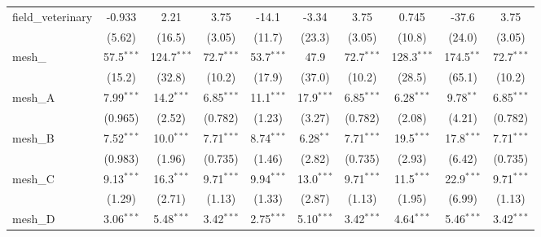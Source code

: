 \begin{tabular}{lccccccccc}
   field\_veterinary                                           & -0.933        & 2.21          & 3.75          & -14.1        & -3.34         & 3.75          & 0.745         & -37.6          & 3.75\\   
                                                               & (5.62)        & (16.5)        & (3.05)        & (11.7)       & (23.3)        & (3.05)        & (10.8)        & (24.0)         & (3.05)\\   
   mesh\_                                                      & 57.5$^{***}$  & 124.7$^{***}$ & 72.7$^{***}$  & 53.7$^{***}$ & 47.9          & 72.7$^{***}$  & 128.3$^{***}$ & 174.5$^{**}$   & 72.7$^{***}$\\   
                                                               & (15.2)        & (32.8)        & (10.2)        & (17.9)       & (37.0)        & (10.2)        & (28.5)        & (65.1)         & (10.2)\\   
   mesh\_A                                                     & 7.99$^{***}$  & 14.2$^{***}$  & 6.85$^{***}$  & 11.1$^{***}$ & 17.9$^{***}$  & 6.85$^{***}$  & 6.28$^{***}$  & 9.78$^{**}$    & 6.85$^{***}$\\   
                                                               & (0.965)       & (2.52)        & (0.782)       & (1.23)       & (3.27)        & (0.782)       & (2.08)        & (4.21)         & (0.782)\\   
   mesh\_B                                                     & 7.52$^{***}$  & 10.0$^{***}$  & 7.71$^{***}$  & 8.74$^{***}$ & 6.28$^{**}$   & 7.71$^{***}$  & 19.5$^{***}$  & 17.8$^{***}$   & 7.71$^{***}$\\   
                                                               & (0.983)       & (1.96)        & (0.735)       & (1.46)       & (2.82)        & (0.735)       & (2.93)        & (6.42)         & (0.735)\\   
   mesh\_C                                                     & 9.13$^{***}$  & 16.3$^{***}$  & 9.71$^{***}$  & 9.94$^{***}$ & 13.0$^{***}$  & 9.71$^{***}$  & 11.5$^{***}$  & 22.9$^{***}$   & 9.71$^{***}$\\   
                                                               & (1.29)        & (2.71)        & (1.13)        & (1.33)       & (2.87)        & (1.13)        & (1.95)        & (6.99)         & (1.13)\\   
   mesh\_D                                                     & 3.06$^{***}$  & 5.48$^{***}$  & 3.42$^{***}$  & 2.75$^{***}$ & 5.10$^{***}$  & 3.42$^{***}$  & 4.64$^{***}$  & 5.46$^{***}$   & 3.42$^{***}$\\   

\end{tabular}
